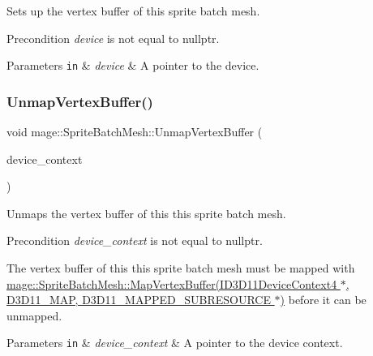 Sets up the vertex buffer of this sprite batch mesh.

\begin{DoxyPrecond}{Precondition}
{\itshape device} is not equal to {\ttfamily nullptr}. 
\end{DoxyPrecond}

\begin{DoxyParams}[1]{Parameters}
\mbox{\tt in}  & {\em device} & A pointer to the device. \\
\hline
\end{DoxyParams}
\hypertarget{classmage_1_1_sprite_batch_mesh_a70a8bb1be693a2d210d410e8df787c24}{}\label{classmage_1_1_sprite_batch_mesh_a70a8bb1be693a2d210d410e8df787c24} 
\subsubsection{\texorpdfstring{Unmap\+Vertex\+Buffer()}{UnmapVertexBuffer()}}
{\footnotesize\ttfamily void mage\+::\+Sprite\+Batch\+Mesh\+::\+Unmap\+Vertex\+Buffer (\begin{DoxyParamCaption}\item[{I\+D3\+D11\+Device\+Context4 $\ast$}]{device\+\_\+context }\end{DoxyParamCaption})}

Unmaps the vertex buffer of this this sprite batch mesh.

\begin{DoxyPrecond}{Precondition}
{\itshape device\+\_\+context} is not equal to {\ttfamily nullptr}. 

The vertex buffer of this this sprite batch mesh must be mapped with \hyperlink{classmage_1_1_sprite_batch_mesh_a9fcba5d0aaea05a12e30844824b0a484}{mage\+::\+Sprite\+Batch\+Mesh\+::\+Map\+Vertex\+Buffer(\+I\+D3\+D11\+Device\+Context4 $\ast$, D3\+D11\+\_\+\+M\+A\+P, D3\+D11\+\_\+\+M\+A\+P\+P\+E\+D\+\_\+\+S\+U\+B\+R\+E\+S\+O\+U\+R\+C\+E $\ast$)} before it can be unmapped. 
\end{DoxyPrecond}

\begin{DoxyParams}[1]{Parameters}
\mbox{\tt in}  & {\em device\+\_\+context} & A pointer to the device context. \\
\hline
\end{DoxyParams}


